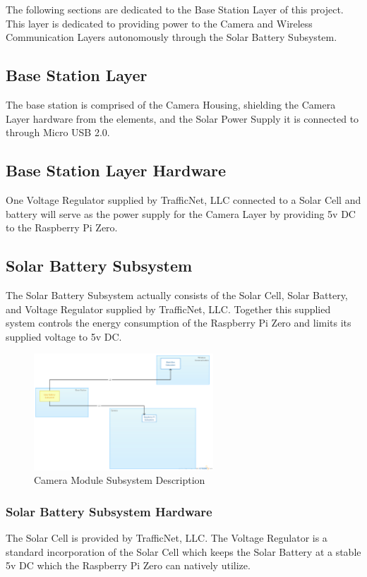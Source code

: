 The following sections are dedicated to the Base Station Layer of this project. This layer is dedicated to providing power to the Camera and Wireless Communication Layers autonomously through the Solar Battery Subsystem.

\subsection{Base Station Layer}
The base station is comprised of the Camera Housing, shielding the Camera Layer hardware from the elements, and the Solar Power Supply it is connected to through Micro USB 2.0.

\subsection{Base Station Layer Hardware}
One Voltage Regulator supplied by TrafficNet, LLC connected to a Solar Cell and battery will serve as the power supply for the Camera Layer by providing 5v DC to the Raspberry Pi Zero.

\subsection{Solar Battery Subsystem}
The Solar Battery Subsystem actually consists of the Solar Cell, Solar Battery, and Voltage Regulator supplied by TrafficNet, LLC. Together this supplied system controls the energy consumption of the Raspberry Pi Zero and limits its supplied voltage to 5v DC.

\begin{figure}[h!] 
 	\centering 
  	\includegraphics[width=0.60\textwidth]{images/ADSdiagrams/solarbatterysubsystem.png} 
 \caption{Camera Module Subsystem Description} 
\end{figure}

\subsubsection{Solar Battery Subsystem Hardware}
The Solar Cell is provided by TrafficNet, LLC. The Voltage Regulator is a standard incorporation of the Solar Cell which keeps the Solar Battery at a stable 5v DC which the Raspberry Pi Zero can natively utilize.


